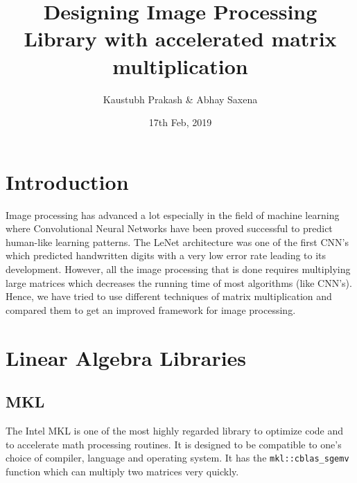 \documentclass{article}
\title{Designing Image Processing Library with accelerated matrix multiplication}
\author{Kaustubh Prakash \& Abhay Saxena}
\affil{Indian Institute of Technology, New Delhi}
\affil{\textit {\{mt1160647,mt6160648\}@iitd.ac.in}}
\date{17th Feb, 2019}
\begin{document}
\maketitle


\pagebreak

\section{Introduction}
\label{introduction}

Image processing has advanced a lot especially in the field of machine learning where Convolutional Neural Networks have been proved successful to predict human-like learning patterns.  The LeNet architecture was one of the first CNN's which predicted handwritten digits with a very low error rate leading to its development. However, all the image processing that is done requires multiplying large matrices which decreases the running time of most algorithms (like CNN's). Hence, we have tried to use different techniques of matrix multiplication and compared them to get an improved framework for image processing.

\section{Linear Algebra Libraries}

\subsection{MKL}

The Intel MKL \cite{intelmkl} is one of the most highly regarded library to optimize code and to accelerate math processing routines. It is designed to be compatible to one's choice of compiler, language and operating system. It has the \verb!mkl::cblas_sgemv! function which can multiply two matrices very quickly.
\end{document}
